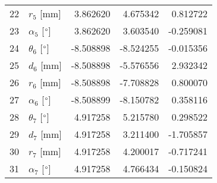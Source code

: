 \documentclass{standalone}%
\begin{document}
\begin{tabular}{llrrr}
22 &              $r_{5}$ [mm] &  3.862620 &   4.675342 &   0.812722 \\
23 &  $\alpha_{5}$ [$\degree$] &  3.862620 &   3.603540 &  -0.259081 \\
24 &  $\theta_{6}$ [$\degree$] & -8.508898 &  -8.524255 &  -0.015356 \\
25 &              $d_{6}$ [mm] & -8.508898 &  -5.576556 &   2.932342 \\
26 &              $r_{6}$ [mm] & -8.508898 &  -7.708828 &   0.800070 \\
27 &  $\alpha_{6}$ [$\degree$] & -8.508899 &  -8.150782 &   0.358116 \\
28 &  $\theta_{7}$ [$\degree$] &  4.917258 &   5.215780 &   0.298522 \\
29 &              $d_{7}$ [mm] &  4.917258 &   3.211400 &  -1.705857 \\
30 &              $r_{7}$ [mm] &  4.917258 &   4.200017 &  -0.717241 \\
31 &  $\alpha_{7}$ [$\degree$] &  4.917258 &   4.766434 &  -0.150824 \\
\bottomrule
\end{tabular}
%
\end{document}
